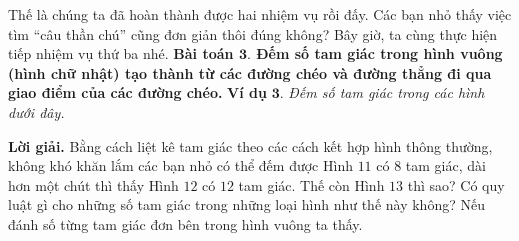	Thế là chúng ta đã hoàn thành được hai nhiệm vụ rồi đấy. Các bạn nhỏ thấy việc tìm “câu thần chú” cũng đơn giản thôi đúng không? Bây giờ, ta cùng thực hiện tiếp nhiệm vụ thứ ba nhé.
	\vskip 0.1cm
	\textbf{\color{toancuabi}Bài toán $\pmb{3.}$ Đếm số tam giác trong hình vuông (hình chữ nhật) tạo thành từ các đường chéo và đường thẳng đi qua giao điểm của các đường chéo.}
	\vskip 0.1cm
	\textbf{\color{toancuabi}Ví dụ} $\pmb{3.}$ \textit{Đếm số tam giác trong các hình dưới đây.}
	\begin{figure}[H]
		\centering
		\vspace*{-5pt}
		\captionsetup{labelformat= empty, justification=centering}
		\captionsetup[subfigure]{labelformat=empty}
		\hfill{}
		\hfill
		\hfill
		\hfill
		\hfill
		\vspace*{-10pt}
	\end{figure} 
	\textbf{\color{toancuabi}Lời giải.}
	\vskip 0.1cm
	Bằng cách liệt kê tam giác theo các cách kết hợp hình thông thường, không khó khăn lắm các bạn nhỏ có thể đếm được Hình $11$ có $8$ tam giác, dài hơn một chút thì thấy Hình $12$ có $12$ tam giác. Thế còn Hình $13$ thì sao? Có quy luật gì cho những số tam giác trong những loại hình như thế này không?
	\vskip 0.1cm
		Nếu đánh số từng tam giác đơn bên trong hình vuông ta thấy.
